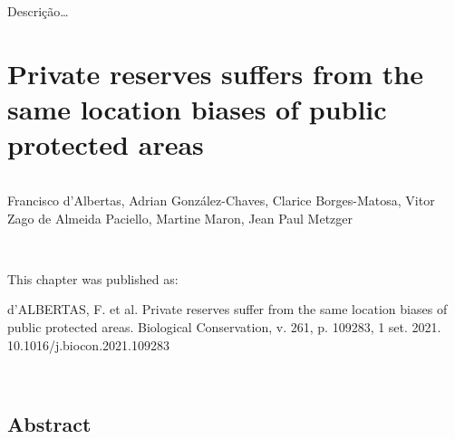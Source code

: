 \documentclass[
	12pt,				%
	oneside,			%
	a4paper,			%
	chapter=TITLE,		%
	section=TITLE,		%
	brazil,			%
	english				%
	]{abntex2}
\begin{document}
Descrição\ldots{}

\hypertarget{private-reserves-suffers-from-the-same-location-biases-of-public-protected-areas}{%
\chapter{Private reserves suffers from the same location biases of public protected areas}\label{private-reserves-suffers-from-the-same-location-biases-of-public-protected-areas}}

\(~\)
\begin{flushleft}

Francisco d’Albertas, Adrian González-Chaves, Clarice Borges-Matosa, Vitor
Zago de Almeida Paciello, Martine Maron, Jean Paul Metzger    

\end{flushleft}
\(~\)
\(~\)
\begin{flushleft}

This chapter was published as:

\end{flushleft}
\begin{flushleft}

d’ALBERTAS, F. et al. Private reserves suffer from the same location biases of public protected areas. Biological Conservation, v. 261, p. 109283, 1 set. 2021. 10.1016/j.biocon.2021.109283

\end{flushleft}
\(~\)
\(~\)

\hypertarget{abstract}{%
\section{Abstract}\label{abstract}}
\end{document}

